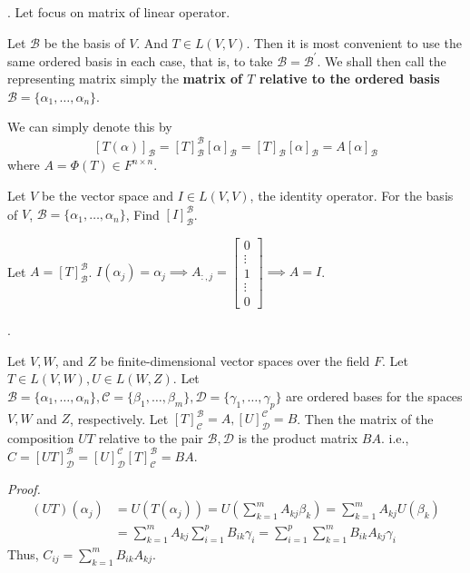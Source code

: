 \documentclass[8pt]{beamer}
\newcommand{\mc}[1]{\mathcal{#1}}
\newcommand{\tb}[1]{\textbf{#1}}
\newcommand{\ti}[1]{\textit{#1}}
\begin{document}
\begin{frame}{.}
    Let focus on matrix of linear operator.

    \begin{definition}
        Let $\mc{B}$ be the basis of $V$. And $T \in L(V,V)$.
        Then it is most convenient to use the same ordered basis in each case, that is, to take $\mc{B} = \mc{B}^\prime$.
        We shall then call the representing matrix simply the \tb{matrix of $T$ relative to the ordered basis $\mc{B} = \{\alpha_1, \dots, \alpha_n\}$}.
    
        \smallskip
        We can simply denote this by
        \[
            [T(\alpha)]_{\mc{B}} = [T]^{\mc{B}}_{\mc{B}}[\alpha]_{\mc{B}} = [T]_{\mc{B}}[\alpha]_{\mc{B}} = A[\alpha]_{\mc{B}}
        \]
        where $A = \Phi(T) \in F^{n \times n}$.
    \end{definition}

    \begin{example}
        Let $V$ be the vector space and $I \in L(V,V)$, the identity operator. For the basis of $V$, $\mc{B} = \{\alpha_1, \dots, \alpha_n\}$, Find $[I]^{\mc{B}}_{\mc{B}}$.
    \end{example}
    Let $A = [T]^{\mc{B}}_{\mc{B}}$.
    $I(\alpha_j) = \alpha_j \implies A_{:, j} = \left[\begin{matrix}
    0 \\ \vdots \\ 1 \\ \vdots \\ 0
    \end{matrix}\right] \implies A = I$.

\end{frame}

\begin{frame}{.}
    \begin{theorem}
        Let $V, W$, and $Z$ be finite-dimensional vector spaces over the field $F$.
        Let $T \in L(V,W), U \in L(W,Z)$.
        Let $\mc{B} = \{\alpha_1, \dots, \alpha_n\}, \mc{C} = \{\beta_1, \dots, \beta_m\}, \mc{D} = \{\gamma_1, \dots, \gamma_p\}$ are ordered bases for the spaces $V, W$ and $Z$, respectively.
        Let $[T]^{\mc{B}}_{\mc{C}} = A, [U]^{\mc{C}}_{\mc{D}} = B$.
        Then the matrix of the composition $UT$ relative to the pair $\mc{B}, \mc{D}$ is the product matrix $BA$. i.e., $C = [UT]^{\mc{B}}_{\mc{D}} = [U]^{\mc{C}}_{\mc{D}} [T]^{\mc{B}}_{\mc{C}} = BA$.
    \end{theorem}

    \ti{Proof.}
    \[  
        \begin{aligned}
            (UT) (\alpha_j) &= U (T(\alpha_j)) = U \left( \sum_{k=1}^m A_{kj} \beta_k \right) = \sum_{k=1}^m A_{kj} U(\beta_k) \\
            &=\sum_{k=1}^m A_{kj} \sum_{i=1}^p B_{ik} \gamma_i = \sum_{i=1}^p \sum_{k=1}^m B_{ik} A_{kj} \gamma_i
        \end{aligned}
    \]
    Thus, $C_{ij} = \sum_{k=1}^m B_{ik} A_{kj}$.
\end{frame}
\end{document}

